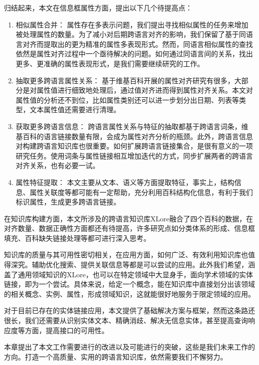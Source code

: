 归结起来，本文在信息框属性方面，提出以下几个待提高点：
\begin{enumerate}[1)]
\item {\heiti 相似属性合并：} 属性存在多表示问题，我们提出寻找相似属性的任务来增加被处理属性的数量。为了减小对后期跨语言对齐的影响，我们保留了基于同语言对齐而提取出的更为精准的属性多表现形式。然而，同语言相似属性的查找依然是属性对齐过程中一个亟待解决的问题。如何通过同语言间的关系，找出更多、更准确的属性表现形式，是我们需要继续研究的工作。
\item {\heiti 抽取更多跨语言属性关系：} 基于维基百科开展的属性对齐研究有很多，大部分是对属性值进行细致地处理后，通过值对齐进而得到属性对齐关系。本文对属性值的分析还不到位，比如属性类别还可以进一步划分出日期、列表等类型，文本属性值还需要进行清理。
\item {\heiti 获取更多跨语言信息：} 跨语言属性关系与特征的抽取都基于跨语言词条，维基百科的语言链接数量有限，会成为属性对齐分析的瓶颈。此外，跨语言信息对构建跨语言知识库也很重要。如何扩展跨语言链接集合，是很有意义的一项研究任务。使用词条与属性链接相互增加迭代的方式，同步扩展两者的跨语言对齐关系，也有必要一试。
\item {\heiti 属性特征提取：} 本文主要从文本、语义等方面提取特征，事实上，结构信息、属性关联度等都可能有一定帮助，充分利用百科结构化信息，有利于我们标识属性，生成更多跨语言链接。
\end{enumerate}

在知识库构建方面，本文所涉及的跨语言知识库XLore融合了四个百科的数据，在对齐数量、数据正确性方面都还有待提高，许多研究点如分类体系的形成、信息框填充、百科缺失链接处理等都可进行深入思考。

知识库的质量与其可用性密切相关，在应用方面，如何广泛、有效利用知识库也值得深究。辅助优化搜索、提供关联信息等都是可以尝试的应用。此外我们希望，涵盖了通用领域知识的XLore，也可以在特定领域中大显身手，面向学术领域的实体链接，即为一个尝试。具体来说，给定一个概念，能在知识库中直接划分出该领域的相关概念、实例、属性，形成领域知识，这就能很好地服务于限定领域的应用。

对于目前已存在的实体链接应用，本文提供了基础解决方案与框架，然而这条路还很长，我们还需要从识别实体文本、精确消歧、解决无信息实体，甚至提高查询响应度等方面，提高接口的可用性。

本章提出了本文工作需要进行的改进以及可能进行的突破，这些是我们未来工作的方向。打造一个高质量、实用的跨语言知识库，依然需要我们不懈努力。


